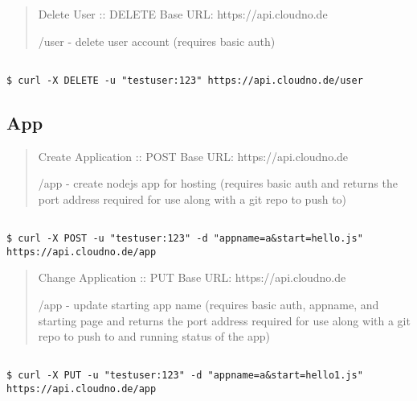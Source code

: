 \begin{quote}

Delete User :: DELETE
Base URL: https:/\slash api.cloudno.de

\slash user - delete user account (requires basic auth)
\end{quote}

\begin{adjustwidth}{2.5em}{2.5em}
\begin{verbatim}

$ curl -X DELETE -u "testuser:123" https://api.cloudno.de/user

\end{verbatim}
\end{adjustwidth}



\subsection{App}
\label{app}

\begin{quote}

Create Application :: POST
Base URL: https:/\slash api.cloudno.de

\slash app - create nodejs app for hosting (requires basic auth and returns the port address required for use along with a git repo to push to)
\end{quote}

\begin{adjustwidth}{2.5em}{2.5em}
\begin{verbatim}

$ curl -X POST -u "testuser:123" -d "appname=a&start=hello.js" https://api.cloudno.de/app

\end{verbatim}
\end{adjustwidth}

\begin{quote}

Change Application :: PUT
Base URL: https:/\slash api.cloudno.de

\slash app - update starting app name (requires basic auth, appname, and starting page and returns the port address required for use along with a git repo to push to and running status of the app)
\end{quote}

\begin{adjustwidth}{2.5em}{2.5em}
\begin{verbatim}

$ curl -X PUT -u "testuser:123" -d "appname=a&start=hello1.js" https://api.cloudno.de/app

\end{verbatim}
\end{adjustwidth}

